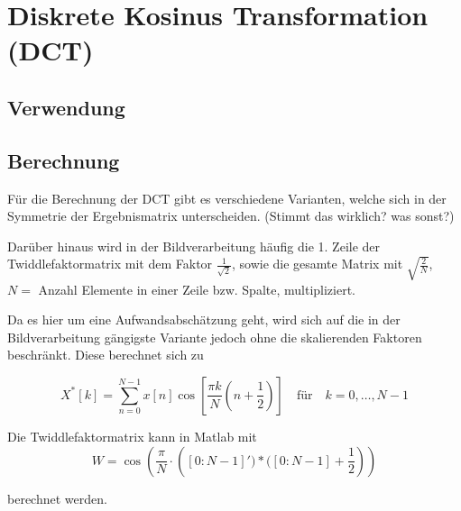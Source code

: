 \section{Diskrete Kosinus Transformation (DCT)}
\subsection{Verwendung}


\subsection{Berechnung}
Für die Berechnung der DCT gibt es verschiedene Varianten, welche sich in der Symmetrie der Ergebnismatrix unterscheiden. (Stimmt das wirklich? was sonst?)

Darüber hinaus wird in der Bildverarbeitung häufig die 1. Zeile der Twiddlefaktormatrix mit dem Faktor $\frac{1}{\sqrt2}$, sowie die gesamte Matrix mit 
$\sqrt{\frac{2}{N}}$, $N =$ Anzahl Elemente in einer Zeile bzw. Spalte, multipliziert.

Da es hier um eine Aufwandsabschätzung geht, wird sich auf die in der Bildverarbeitung gängigste Variante jedoch ohne die skalierenden Faktoren beschränkt.
Diese berechnet sich zu

\begin{equation}
X^*[k] = \sum_{n=0}^{N-1} x[n] \cos\left[\frac{\pi k}{N} \left(n+\frac{1}{2}\right) \right] \quad \textrm{für} \quad  k=0,\dots,N-1
\end{equation}

Die Twiddlefaktormatrix kann in Matlab mit
 \begin{equation}\label{eq:matlab_dct_faktoren}
  W = \cos\left(\frac{\pi}{N}\cdot \left([0:N-1]')*([0:N-1]+\frac{1}{2}\right)\right)
 \end{equation}

berechnet werden.